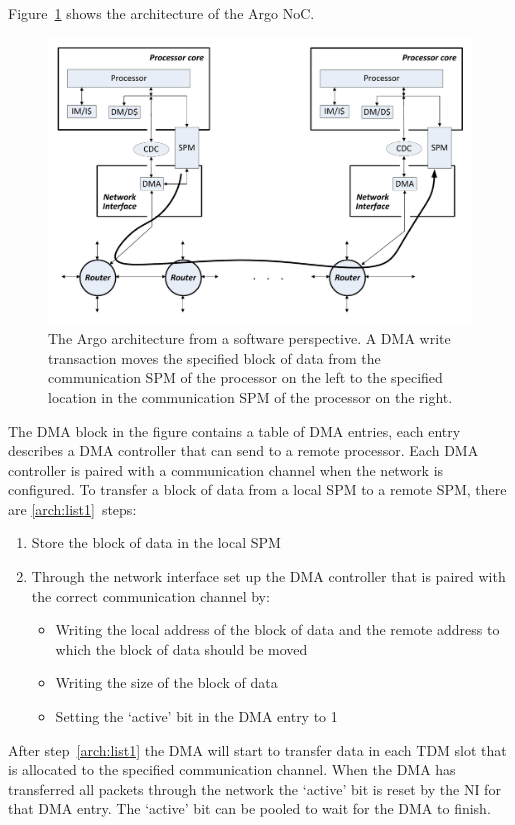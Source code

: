 \documentclass[a4paper,fontsize=10pt,twoside,DIV15,BCOR12mm,headinclude=true,footinclude=false,pagesize,bibtotoc]{scrbook}
\begin{document}
Figure~\ref{fig:argo-arch} shows the architecture of the Argo NoC.
\begin{figure}[b!]
\centering
\includegraphics[width=\textwidth]{fig/argo-arch.pdf}
\caption{The Argo architecture from a software perspective.
A DMA write transaction moves the specified block of data from the
communication SPM of the processor on the left to the specified
location in the communication SPM of the processor on the right.}
\label{fig:argo-arch}
\end{figure}
The DMA block in the figure contains a table of DMA entries,
each entry describes a DMA controller that can send to a remote processor.
Each DMA controller is paired with a communication channel when the network is configured. 
To transfer a block of data from a local SPM to a remote SPM, there are \ref{arch:list1}~steps:
\begin{enumerate}
\item Store the block of data in the local SPM
\item Through the network interface set up the DMA controller that is paired with the correct communication channel by:
  \begin{itemize}
  \item Writing the local address of the block of data and the remote address to which the block of data should be moved
  \item Writing the size of the block of data
  \item Setting the `active' bit in the DMA entry to 1
  \end{itemize}
\label{arch:list1}\end{enumerate}
After step~\ref{arch:list1} the DMA will start to transfer data in each TDM slot that is allocated to the specified communication channel.
When the DMA has transferred all packets through the network the `active' bit is reset by the NI for that DMA entry. The `active' bit can be pooled to wait for the DMA to finish.
\end{document}
